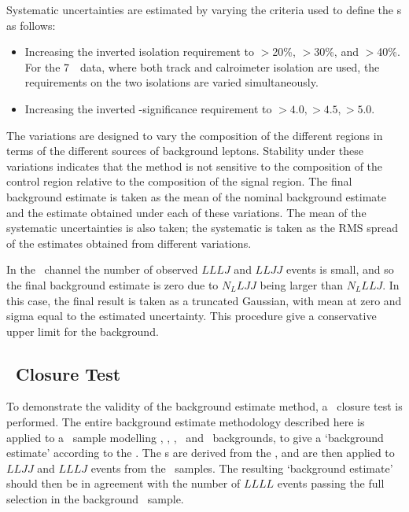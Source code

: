 Systematic uncertainties are estimated by varying the criteria used to define
the \lljet s as follows:
\begin{itemize}
\item Increasing the inverted isolation requirement to $>$20\%, $>$30\%, and
$>$40\%. For the 7~\tev\ data, where both track and calroimeter isolation are
used, the requirements on the two isolations are varied
simultaneously.
\item Increasing the inverted \dzero-significance requirement to
$>4.0,>4.5,>5.0$.
\end{itemize}
The variations are designed to vary the composition of the different regions in
terms of the different sources of background leptons. Stability under these
variations indicates that the method is not sensitive to the composition of the
control region relative to the composition of the signal region. The final
background estimate is taken as the mean of the nominal background estimate and
the estimate obtained under each of these variations. The mean of the systematic
uncertainties is also taken; the systematic is taken as the RMS spread of the
estimates obtained from different variations.

In the \mmmm\ channel the number of observed $LLLJ$ and $LLJJ$ events is small,
and so the final background estimate is zero due to $N_LLJJ$ being larger than
$N_LLLJ$. In this case, the final result is taken as a truncated Gaussian, with
mean at zero and sigma equal to the estimated uncertainty. This procedure give a
conservative upper limit for the background.

\subsection{\mc\ Closure Test}

To demonstrate the validity of the background estimate method, a \mc\ closure
test is performed. The entire background estimate methodology described here is
applied to a \mc\ sample modelling \Zjets, \ttbar,
\singletop, \WZ\ and \WW\ backgrounds, to give a `background estimate' according
to the \mc. The \ffactor s are derived from the \mc, and are then applied
to $LLJJ$ and $LLLJ$ events from the \mc\ samples. The resulting `background
estimate' should then be in agreement with the number of $LLLL$ events passing the full
selection in the background \mc\ sample.


